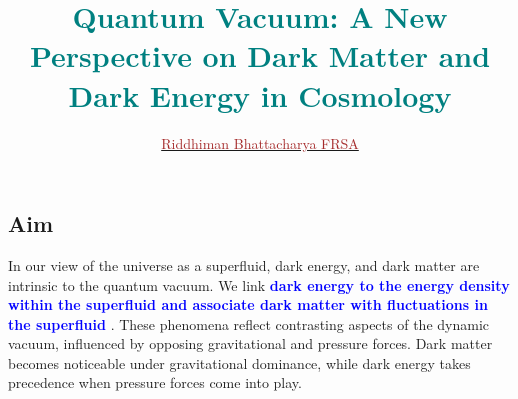 \documentclass{sciposter}
\title{\textcolor{teal}{Quantum Vacuum: A New Perspective on Dark Matter and Dark Energy in Cosmology}}
\author{\href{https://orcid.org/0009-0008-3238-1860}{\textcolor{brown}{Riddhiman Bhattacharya FRSA}}}
\institute 
{\textcolor{blue}{Independent Researcher and Fellow of Royal Society of Arts, FRSA}}
\begin{document}


\maketitle
\begin{multicols}{3}

\section{{Aim}}
In our view of the universe as a superfluid, dark energy, and dark matter are intrinsic to the quantum vacuum. We link \textcolor{blue}{\textbf{dark energy to the energy density within the superfluid and associate dark matter with fluctuations in the superfluid }} \cite{huang2013}. These phenomena reflect contrasting aspects of the dynamic vacuum, influenced by opposing gravitational and pressure forces. Dark matter becomes noticeable under gravitational dominance, while dark energy takes precedence when pressure forces come into play.

\end{multicols}
\end{document}
